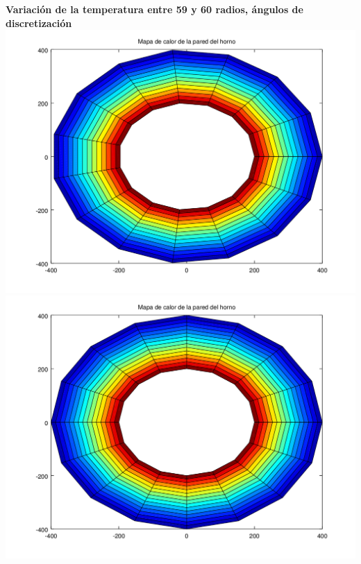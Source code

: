 \begin{enumerate}
	  	\textbf{Variación de la temperatura entre 59 y 60 radios, ángulos de discretización}\\
	  	\includegraphics[scale=0.35]{experimentos1a_1b/evolucion_posicion_isoterma_temperatura/variacion_radios_angulos_se_reduce_diferencia_radial/test11_testord_001_inst_001_heatmap.png}
		\includegraphics[scale=0.35]{experimentos1a_1b/evolucion_posicion_isoterma_temperatura/variacion_radios_angulos_se_reduce_diferencia_radial/test11_testord_002_inst_001_heatmap.png}


\end{enumerate}
